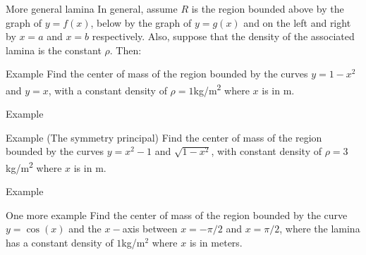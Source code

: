\documentclass[presentation]{beamer}
\begin{document}
\begin{frame}[label={sec:orgd8f6273}]{More general lamina}
In general, assume \(R\) is the region bounded above by the graph of
\(y = f(x)\), below by the graph of \(y = g(x)\) and on the left and
right by \(x = a\) and \(x = b\) respectively.  Also, suppose that the density of the associated lamina is the constant \(\rho.\) Then:

\vspace{10in}
\end{frame}

\begin{frame}[label={sec:org3da8c46}]{Example}
Find the center of mass of the region bounded by the curves
\(y = 1-x^2\) and \(y = x\), with a constant density of \(\rho=1\)kg/m\textsuperscript{2} where \(x\) is in m.
\vspace{10in}
\end{frame}

\begin{frame}[label={sec:orgf0b9ee9}]{Example}
\end{frame}

\begin{frame}[label={sec:org9f7b6f9}]{Example (The symmetry principal)}
Find the center of mass of the region bounded by the curves \(y =
x^2-1\) and \(\sqrt{1-x^2}\), with constant density of \(\rho=3\)kg/m\textsuperscript{2} where \(x\) is in m.
\vspace{10in}
\end{frame}

\begin{frame}[label={sec:org05ec2b9}]{Example}
\end{frame}

\begin{frame}[label={sec:org291dc6c}]{One more example}
Find the center of mass of the region bounded by the curve \(y =
\cos(x)\) and the \(x-\)axis between \(x=-\pi/2\) and \(x=\pi/2\),
where the lamina has a constant density of \(1\)kg/m\(^2\) where \(x\) is in meters.
\vspace{10in}
\end{frame}
\end{document}
